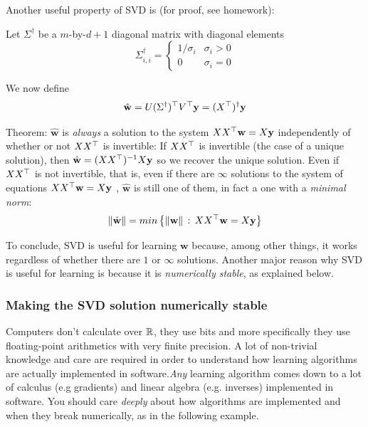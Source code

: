 \vspace{5mm}

Another useful property of SVD is (for proof, see homework):

Let $\Sigma^\dagger$ be a  $m$-by-$d+1$  diagonal matrix with diagonal elements
  \[
   \Sigma^\dagger_{i,i} =
   \begin{cases}
 1/\sigma_i & \sigma_i>0\\
 0 & \sigma_i=0
   \end{cases}
  \]

 We now define
    \[
  \hat{\mathbf{w}}=U (\Sigma^\dagger)^{\top} V^{\top} \mathbf{y} =(X^{\top})^{\dagger}\mathbf{y}
    \]


Theorem: $\hat{\mathbf{w}}$ is \emph{always} a solution to the system  $XX^{\top} \mathbf{w}=X\mathbf{y}$ independently of whether or not $X X^{\top}$ is invertible:
If $X X^{\top}$ is invertible (the case of a unique solution), then  $\hat{\mathbf{w}} = (XX^{\top})^{-1}X\mathbf{y}$ so we recover the unique solution.
Even if $X X^{\top}$ is not invertible, that is, even if there are $\infty$  solutions to the system of equations  $XX^{\top} \mathbf{w}=X\mathbf{y}$ , $\hat{\mathbf{w}}$ is still one of them, in fact a one with a \emph{minimal norm}:
  $$\left\| \hat{\mathbf{w}}\right\|=min\left\{ \left\| \mathbf{w}\right\|\,:\,XX^{\top} \mathbf{w}=X\mathbf{y} \right\}$$


\vspace{4mm}
To conclude, SVD is useful for learning $\mathbf{w}$ because, among other things, it  works regardless of whether there are $1$ or $\infty$ solutions.
Another major reason why SVD is useful for learning is because it is \emph{numerically stable}, as explained below.

\subsubsection{Making the SVD solution numerically stable}

Computers don't calculate over $\mathbb{R}$, they use bits and more specifically they use floating-point arithmetics with very finite precision. A lot of non-trivial knowledge and care are required in order to understand how learning algorithms are actually implemented in software.\textit{Any} learning algorithm comes down to a lot of calculus (e.g gradients) and linear algebra (e.g. inverses) implemented in software. You should care \textit{deeply} about how algorithms are implemented and when they break numerically, as in the following example.
\vspace{5mm}


